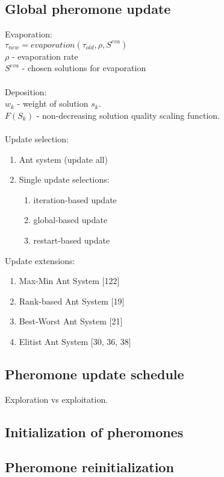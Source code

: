 \documentclass[12pt]{article}
\begin{document}
\subsection{Global pheromone update}
Evaporation: \\
$\tau_{new}=evaporation(\tau_{old}, \rho, S^{eva})$ \\
$\rho$ - evaporation rate \\
$S^{eva}$ - chosen solutions for evaporation \\ \\

Deposition: \\
$w_k$ - weight of solution $s_k$. \\
$F(S_k)$ - non-decreasing solution quality scaling function. \\ \\

Update selection:
\begin{enumerate}
\item {Ant system (update all)}
\item {Single update selections:}
\begin{enumerate}
\item {iteration-based update}
\item {global-based update}
\item {restart-based update}
\end{enumerate}
\end{enumerate}

Update extensions: \\
\begin{enumerate}
\item {Max-Min Ant System [122]}
\item {Rank-based Ant System [19]}
\item {Best-Worst Ant System [21]}
\item {Elitist Ant System [30, 36, 38]}
\end{enumerate}

\subsection{Pheromone update schedule}
Exploration vs exploitation.

\subsection{Initialization of pheromones}


\subsection{Pheromone reinitialization}
\end{document}
